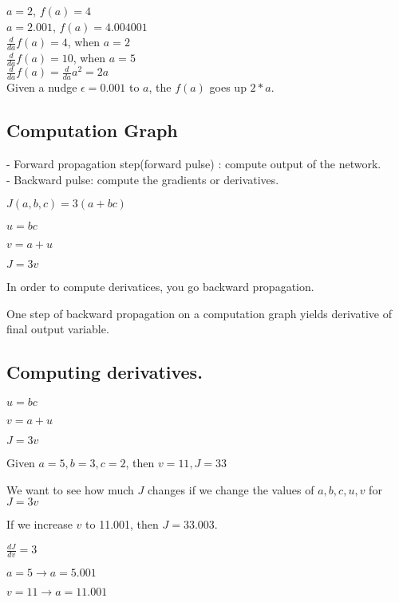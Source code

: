 \documentclass{article}
\begin{document}
    $a=2$, $f(a)=4$\\

    $a=2.001$, $f(a)=4.004001$\\

    $\frac{d}{da}f(a) = 4$, when $a=2$\\

    $\frac{d}{da}f(a) = 10$, when $a=5$\\

    $\frac{d}{da}f(a) = \frac{d}{da}a^2 = 2a$\\

    Given a nudge $\epsilon= 0.001$ to $a$, the $f(a)$ goes up $2*a$.\\

\newpage
\subsection{Computation Graph}

    - Forward propagation step(forward pulse) : compute output of the network.\\
    - Backward pulse: compute the gradients or derivatives.

    $J(a,b,c) = 3(a+bc)$

    $u=bc$

    $v = a+u$

    $J=3v$

    In order to compute derivatices, you go backward propagation.

    One step of backward propagation on a computation graph yields derivative of final output variable.



\newpage
\subsection{Computing derivatives.}

    $u=bc$

    $v = a+u$

    $J=3v$

    Given $a=5, b=3, c=2$, then $v=11, J=33$

    We want to see how much $J$ changes if we change the values of $a,b,c,u,v$ for $J=3v$

    If we increase $v$ to 11.001, then $J=33.003$.

    $\frac{dJ}{dv} = 3$

    $a=5 \rightarrow a=5.001$

$v=11 \rightarrow a=11.001$
\end{document}
